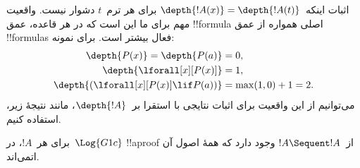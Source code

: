 \documentclass[../../../include/open-logic-section]{subfiles}
\begin{document}
اثبات اینکه~$\depth{!A(x)} = \depth{!A(t)}$ برای هر ترم~$t$ دشوار
نیست. واقعیت مهم برای ما این است که در هر قاعده، عمق !!{formula} اصلی
همواره از عمق !!{formula}s فعال بیشتر است. برای نمونه:
\begin{align*}
\depth{P(x)} = \depth{P(a)} & = 0,\\
\depth{\lforall[x][P(x)]} & = 1,\\
\depth{(\lforall[x][P(x)] \lif P(a))} & = \max(1,0) + 1 = 2.
\end{align*}
می‌توانیم از این واقعیت برای اثبات نتایجی با استقرا بر~$\depth{!A}$، مانند
نتیجهٔ زیر، استفاده کنیم.

\begin{prop}
برای هر~$!A$، در~$\Log{G1c}$ !!a{proof} از~$!A \Sequent !A$ وجود دارد
که همهٔ اصول آن اتمی‌اند.
\end{prop}
\end{document}
